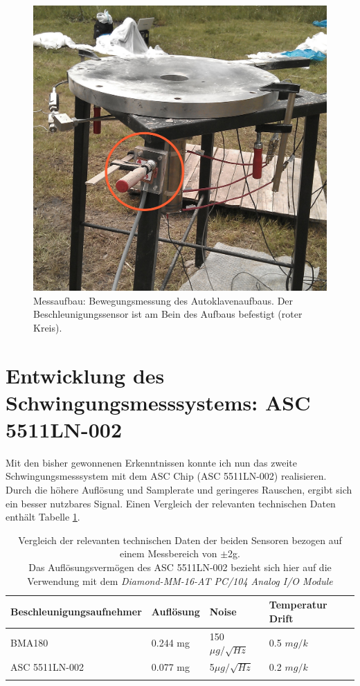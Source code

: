 \documentclass[12pt,a4paper]{scrartcl}
\begin{document}
\begin{figure}[H]
\centering
\includegraphics[scale=.13]{hardwareimages/tisch.jpg}
\caption{Messaufbau: Bewegungsmessung des Autoklavenaufbaus. Der Beschleunigungssensor ist am Bein des Aufbaus befestigt (roter Kreis).}
\label{tisch}
\end{figure}




\newpage
\section{Entwicklung des Schwingungsmesssystems: ASC 5511LN-002}


Mit den bisher gewonnenen Erkenntnissen konnte ich nun das zweite Schwingungsmesssystem mit dem ASC Chip (ASC 5511LN-002) realisieren. Durch die höhere Auflösung und Samplerate und geringeres Rauschen, ergibt sich ein besser nutzbares Signal. Einen Vergleich der relevanten technischen Daten enthält Tabelle \ref{sensorcompare}.

\begin{table}[ht]
\begin{tabular}{@{}llll@{}}    
      			\cmidrule(r){1-4}\morecmidrules\cmidrule(r){1-4}
       			Beschleunigungsaufnehmer & Auflösung & Noise & Temperatur Drift\\
      			\midrule
 			BMA180 				   & 0.244 mg  & 150$\mu g / \sqrt{Hz}$ & 0.5 $mg/k$ \\ 
 			ASC 5511LN-002 		   & 0.077 mg  &    5$\mu g / \sqrt{Hz}$  & 0.2 $mg/k$\\
 		
   			\addlinespace
   			\bottomrule
 \end{tabular}
 \caption{Vergleich der relevanten technischen Daten der beiden Sensoren bezogen auf einem Messbereich von $\pm$2g.\\ Das Auflösungsvermögen des ASC 5511LN-002 bezieht sich hier auf die Verwendung mit  dem \textit{Diamond-MM-16-AT PC/104 Analog I/O Module}}
 \label{sensorcompare}
\end{table}
\end{document}
